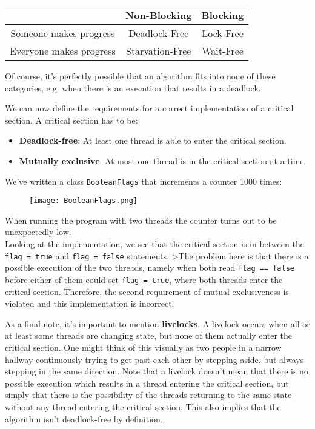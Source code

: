 \documentclass[main]{subfiles}
\begin{document}
\begin{center}
    \begin{tabular}{c|c|c}
         &  Non-Blocking & Blocking\\
         \hline
        Someone makes progress & Deadlock-Free & Lock-Free \\
        \hline
        Everyone makes progress & Starvation-Free & Wait-Free
    \end{tabular}
\end{center}
\noindent Of course, it's perfectly possible that an algorithm fits into none of these categories, e.g. when there is an execution that results in a deadlock.\clearpage

\noindent We can now define the requirements for a correct implementation of a critical section. A critical section has to be:
\begin{itemize}
    \item \textbf{Deadlock-free}: At least one thread is able to enter the critical section.
    \item \textbf{Mutually exclusive}: At most one thread is in the critical section at a time.
\end{itemize}

\begin{example}
    We've written a class \texttt{BooleanFlags} that increments a counter 1000 times:
    \begin{figure}[H]
        \centering
        \texttt{[image: BooleanFlags.png]}
    \end{figure}
    \noindent When running the program with two threads the counter turns out to be unexpectedly low.\\[3mm]
    Looking at the implementation, we see that the critical section is in between the \texttt{flag = true} and \texttt{flag = false} statements. >The problem here is that there is a possible execution of the two threads, namely when both read \texttt{flag == false} before either of them could set \texttt{flag = true}, where both threads enter the critical section. Therefore, the second requirement of mutual exclusiveness is violated and this implementation is incorrect. 
\end{example}

\noindent As a final note, it's important to mention \textbf{livelocks}. A livelock occurs when all or at least some threads are changing state, but none of them actually enter the critical section. One might think of this visually as two people in a narrow hallway continuously trying to get past each other by stepping aside, but always stepping in the same direction. Note that a livelock doesn't mean that there is no possible execution which results in a thread entering the critical section, but simply that there is the possibility of the threads returning to the same state without any thread entering the critical section. This also implies that the algorithm isn't deadlock-free by definition.\\
\end{document}
